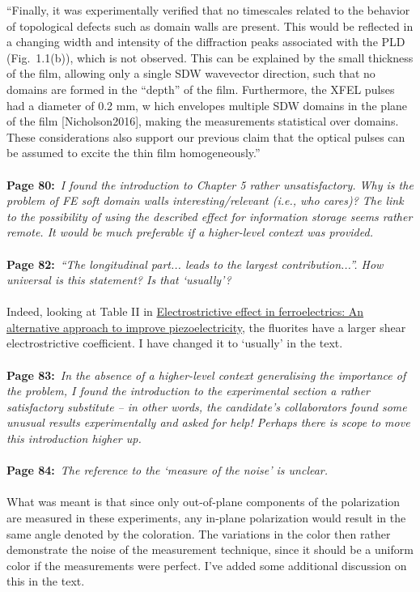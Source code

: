 \documentclass[a4, UTF8]{article}
\begin{document}
``Finally, it was experimentally verified that no timescales related to the behavior of topological defects such as domain walls are present. This would be reflected in a changing width and intensity of the diffraction peaks associated with the PLD (Fig.~1.1(b)), which is not observed. This can be explained by the small thickness of the film, allowing only a single SDW wavevector direction, such that no domains are formed in the ``depth'' of the film. Furthermore, the XFEL pulses had a diameter of 0.2 mm, w hich envelopes multiple SDW domains in the plane of the film [Nicholson2016], making the measurements statistical over domains.
These considerations also support our previous claim that the optical pulses can be assumed to excite the thin film homogeneously.''
\\\\
{\bf Page 80:}~{\it I found the introduction to Chapter 5 rather unsatisfactory. Why is the problem of FE soft domain walls interesting/relevant (i.e., who cares)? The link to the possibility of using the described effect for information storage seems rather remote. It would be much preferable if a
higher-level context was provided.}
\\\\
{\bf Page 82:}~{\it ``The longitudinal part... leads to the largest contribution...''. How universal is this statement? Is that `usually'?}
\\\\
Indeed, looking at Table II in \href{http://dx.doi.org/10.1063/1.4861260}{Electrostrictive effect in ferroelectrics: An alternative approach to improve piezoelectricity}, the fluorites have a larger shear electrostrictive coefficient. I have changed it to `usually' in the text.
\\\\
{\bf Page 83:}~{\it In the absence of a higher-level context generalising the importance of the problem, I found the introduction to the experimental section a rather satisfactory substitute – in other words, the candidate’s collaborators found some unusual results experimentally and asked for help!
Perhaps there is scope to move this introduction higher up.}
\\\\
{\bf Page 84:}~{\it The reference to the `measure of the noise’ is unclear.}
\\\\
What was meant is that since only out-of-plane components of the polarization are measured in these experiments, any in-plane polarization would result in the same angle denoted by the coloration. The variations in the color then rather demonstrate the noise of the measurement technique, since it should be a uniform color if the measurements were perfect. I've added some additional discussion on this in the text.
\end{document}
